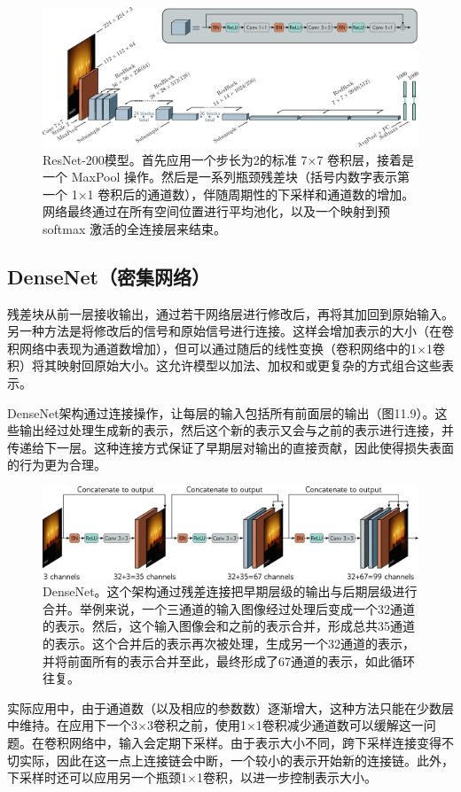 \begin{figure}[ht!]
\centering
\includegraphics[width=0.7\linewidth]{png/chapter11/ResidualResnet2.png}
\caption{ResNet-200模型。首先应用一个步长为2的标准 7×7 卷积层，接着是一个 MaxPool 操作。然后是一系列瓶颈残差块（括号内数字表示第一个 1×1 卷积后的通道数），伴随周期性的下采样和通道数的增加。网络最终通过在所有空间位置进行平均池化，以及一个映射到预 softmax 激活的全连接层来结束。}
\end{figure}


\subsection{DenseNet（密集网络）}
残差块从前一层接收输出，通过若干网络层进行修改后，再将其加回到原始输入。另一种方法是将修改后的信号和原始信号进行连接。这样会增加表示的大小（在卷积网络中表现为通道数增加），但可以通过随后的线性变换（卷积网络中的1×1卷积）将其映射回原始大小。这允许模型以加法、加权和或更复杂的方式组合这些表示。

DenseNet架构通过连接操作，让每层的输入包括所有前面层的输出（图11.9）。这些输出经过处理生成新的表示，然后这个新的表示又会与之前的表示进行连接，并传递给下一层。这种连接方式保证了早期层对输出的直接贡献，因此使得损失表面的行为更为合理。

\begin{figure}[ht!]
\centering
\includegraphics[width=0.7\linewidth]{png/chapter11/ResidualDensenet.png}
\caption{DenseNet。这个架构通过残差连接把早期层级的输出与后期层级进行合并。举例来说，一个三通道的输入图像经过处理后变成一个32通道的表示。然后，这个输入图像会和之前的表示合并，形成总共35通道的表示。这个合并后的表示再次被处理，生成另一个32通道的表示，并将前面所有的表示合并至此，最终形成了67通道的表示，如此循环往复。}
\end{figure}


实际应用中，由于通道数（以及相应的参数数）逐渐增大，这种方法只能在少数层中维持。在应用下一个3×3卷积之前，使用1×1卷积减少通道数可以缓解这一问题。在卷积网络中，输入会定期下采样。由于表示大小不同，跨下采样连接变得不切实际，因此在这一点上连接链会中断，一个较小的表示开始新的连接链。此外，下采样时还可以应用另一个瓶颈1×1卷积，以进一步控制表示大小。


